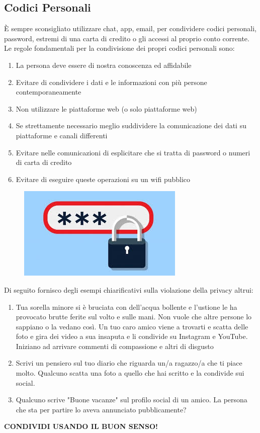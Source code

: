 \documentclass{article}
\begin{document}
\subsection{Codici Personali}
È sempre sconsigliato utilizzare chat, app, email, per condividere codici personali, password, estremi di una carta di credito o gli accessi al proprio conto corrente. Le regole fondamentali per la condivisione dei propri codici personali sono:
\begin{enumerate}
	\item La persona deve essere di nostra conoscenza ed affidabile
	\item Evitare di condividere i dati e le informazioni con più persone contemporaneamente
	\item Non utilizzare le piattaforme web (o solo piattaforme web)
	\item Se strettamente necessario meglio suddividere la comunicazione dei dati su piattaforme e canali differenti
	\item Evitare nelle comunicazioni di esplicitare che si tratta di password o numeri di carta di credito
	\item Evitare di eseguire queste operazioni su un wifi pubblico
\end{enumerate}\begin{figure}[h!]
\centering
\includegraphics[scale=0.5]{Image3.jpg}
\end{figure}
Di seguito fornisco degli esempi chiarificativi sulla violazione della privacy altrui:
\begin{enumerate}
	\item Tua sorella minore si è bruciata con dell’acqua bollente e l’ustione le ha provocato brutte ferite sul volto e sulle mani. Non vuole che altre persone lo sappiano o la vedano così. Un tuo caro amico viene a trovarti e scatta delle foto e gira dei video a sua insaputa e li condivide su Instagram e YouTube. Iniziano ad arrivare commenti di compassione e altri di disgusto
	\item Scrivi un pensiero sul tuo diario che riguarda un/a ragazzo/a che ti piace molto. Qualcuno scatta una foto a quello che hai scritto e la condivide sui social.
	\item Qualcuno scrive "Buone vacanze" sul profilo social di un amico.	La persona che sta per partire lo aveva annunciato pubblicamente?
\end{enumerate}
\begin{center}
	\begin{huge}
		\textbf{CONDIVIDI USANDO IL BUON SENSO!}
	\end{huge}
\end{center}
\end{document}

